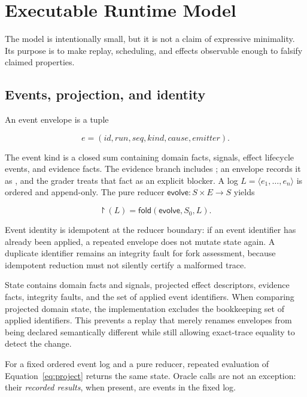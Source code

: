 \section{Executable Runtime Model}
\label{sec:model}

The model is intentionally small, but it is not a claim of expressive
minimality.  Its purpose is to make replay, scheduling, and effects observable
enough to falsify claimed properties.

\subsection{Events, projection, and identity}

An event envelope is a tuple

\begin{equation}
 e = (id, run, seq, kind, cause, emitter).
 \label{eq:event-envelope}
\end{equation}

The event kind is a closed sum containing domain facts, signals, effect
lifecycle events, and evidence facts.  The evidence branch includes
; an envelope records it as
, and the grader treats that fact
as an explicit blocker.  A log
$L = \langle e_1,\ldots,e_n\rangle$ is ordered and append-only.  The pure
reducer $\mathsf{evolve}:S\times E\rightarrow S$ yields

\begin{equation}
 \project(L) = \mathsf{fold}(\mathsf{evolve}, S_0, L).
 \label{eq:project}
\end{equation}

Event identity is idempotent at the reducer boundary: if an event identifier
has already been applied, a repeated envelope does not mutate state again.  A
duplicate identifier remains an integrity fault for fork assessment, because
idempotent reduction must not silently certify a malformed trace.

State contains domain facts and signals, projected effect descriptors,
evidence facts, integrity faults, and the set of applied event identifiers.
When comparing projected domain state, the implementation excludes the
bookkeeping set of applied identifiers.  This prevents a replay that merely
renames envelopes from being declared semantically different while still
allowing exact-trace equality to detect the change.

\begin{proposition}
For a fixed ordered event log and a pure reducer, repeated evaluation of
Equation~\ref{eq:project} returns the same state.  Oracle calls are not an
exception: their \emph{recorded results}, when present, are events in the fixed
log.
\end{proposition}

